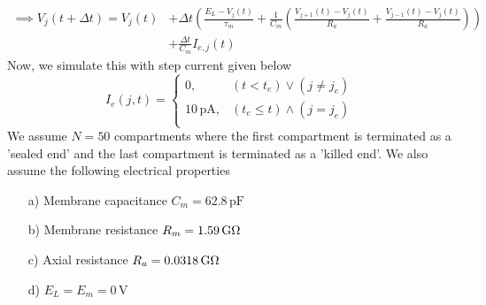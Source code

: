 \documentclass[12pt]{article}
\begin{document}
\begin{enumerate}
    \begin{align*}
        \implies V_{j}(t + \Delta t) = V_{j}(t) &+ \Delta t \left( \frac{E_{L} - V_{j}(t)}{\tau_{m}} + \frac{1}{C_{m}} \left( \frac{V_{j+1}(t) - V_{j}(t)}{R_{a}} + \frac{V_{j-1}(t) - V_{j}(t)}{R_{a}}\right) \right)\\
        &+ \frac{\Delta t}{C_{m}}I_{e, j}(t)
    \end{align*}
    Now, we simulate this with step current given below 
    \[
    I_{e}(j, t)= 
    \begin{cases}
        0, & (t < t_{e}) \vee (j \neq j_{e})\\
        10 \, \text{pA} ,              & (t_{e} \leqslant t) \wedge (j = j_{e})\\
    \end{cases}
    \]
    We assume $N = 50$ compartments where the first compartment is terminated as a 'sealed end' 
    and the last compartment is terminated as a 'killed end'. We also assume the following electrical properties
    \begin{enumerate}
        \item[a)] Membrane capacitance $C_{m} = 62.8 \, \text{pF}$
        \item[b)] Membrane resistance $R_{m} = 1.59 \, \text{G\si{\ohm}}$
        \item[c)] Axial resistance $R_{a} = 0.0318 \, \text{G\si{\ohm}}$
        \item[d)] $E_{L} = E_{m} = 0 \, \text{V}$
    \end{enumerate}
\end{enumerate}
\end{document}
